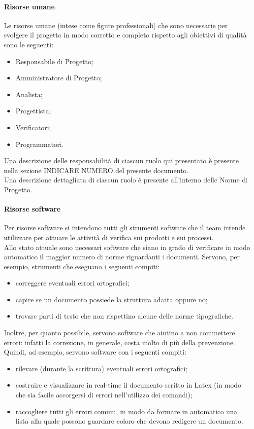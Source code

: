 				\paragraph{Risorse umane}
					Le risorse umane (intese come figure professionali) che sono necessarie per svolgere il progetto in modo corretto e completo 
					rispetto agli obiettivi di qualità sono le seguenti:
					\begin{itemize}
						\item Responsabile di Progetto;
						\item Amministratore di Progetto;
						\item Analista;
						\item Progettista;
						\item Verificatori;
						\item Programmatori.
					\end{itemize}
					Una descrizione delle responsabilità di ciascun ruolo qui presentato è presente nella sezione INDICARE NUMERO del presente documento.\\
					Una descrizione dettagliata di ciascun ruolo è presente all'interno delle Norme di Progetto.
				\paragraph{Risorse software}
					Per risorse software si intendono tutti gli strumenti software che il team intende utilizzare per attuare le attività di verifica sui 
					prodotti e sui processi.\\
					Allo stato attuale sono necessari software che siano in grado di verificare in modo automatico il maggior numero di norme riguardanti 
					i documenti. Servono, per esempio, strumenti che eseguano i seguenti compiti:
					\begin{itemize}
						\item correggere eventuali errori ortografici;
						\item capire se un documento possiede la struttura adatta oppure no;
						\item trovare parti di testo che non rispettino alcune delle norme tipografiche.
					\end{itemize}
					Inoltre, per quanto possibile, servono software che aiutino a non commettere errori: infatti la correzione, in generale, costa 
					molto di più della prevenzione. Quindi, ad esempio, servono software con i seguenti compiti:
					\begin{itemize}
						\item rilevare (durante la scrittura) eventuali errori ortografici;
						\item costruire e visualizzare in real-time il documento scritto in Latex (in modo che sia facile accorgersi di errori 
						nell'utilizzo dei comandi);
						\item raccogliere tutti gli errori comuni, in modo da formare in automatico una lista alla quale possono guardare coloro che 
						devono redigere un documento. 
					\end{itemize}

